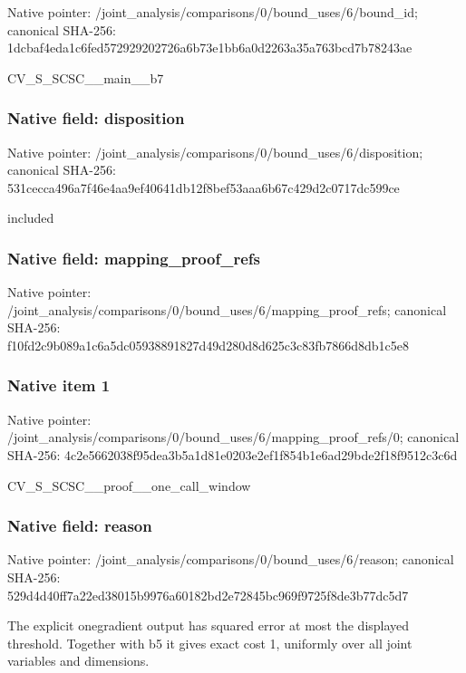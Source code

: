 \documentclass[10pt,a4paper]{article}
\begin{document}
Native pointer: /joint\_analysis/comparis\allowbreak{}ons/0/bound\_uses/6/bound\allowbreak{}\_id; canonical SHA-256: 1dcbaf4eda1c6fed57292920\allowbreak{}2726a6b73e1bb6a0d2263a35\allowbreak{}a763bcd7b78243ae


CV\_S\_SCSC\_\_main\_\_b7


\subsubsection{Native field: disposition}


Native pointer: /joint\_analysis/comparis\allowbreak{}ons/0/bound\_uses/6/dispo\allowbreak{}sition; canonical SHA-256: 531cecca496a7f46e4aa9ef4\allowbreak{}0641db12f8bef53aaa6b67c4\allowbreak{}29d2c0717dc599ce


included


\subsubsection{Native field: mapping\_proof\_refs}


Native pointer: /joint\_analysis/comparis\allowbreak{}ons/0/bound\_uses/6/mappi\allowbreak{}ng\_proof\_refs; canonical SHA-256: f10fd2c9b089a1c6a5dc0593\allowbreak{}8891827d49d280d8d625c3c8\allowbreak{}3fb7866d8db1c5e8



\subsubsection{Native item 1}


Native pointer: /joint\_analysis/comparis\allowbreak{}ons/0/bound\_uses/6/mappi\allowbreak{}ng\_proof\_refs/0; canonical SHA-256: 4c2e5662038f95dea3b5a1d8\allowbreak{}1e0203e2ef1f854b1e6ad29b\allowbreak{}de2f18f9512c3c6d


CV\_S\_SCSC\_\_proof\_\_one\_call\_window


\subsubsection{Native field: reason}


Native pointer: /joint\_analysis/comparis\allowbreak{}ons/0/bound\_uses/6/reaso\allowbreak{}n; canonical SHA-256: 529d4d40ff7a22ed38015b99\allowbreak{}76a60182bd2e72845bc969f9\allowbreak{}725f8de3b77dc5d7


The explicit onegradient output has squared error at most the displayed threshold. Together with b5 it gives exact cost 1, uniformly over all joint variables and dimensions.
\end{document}
